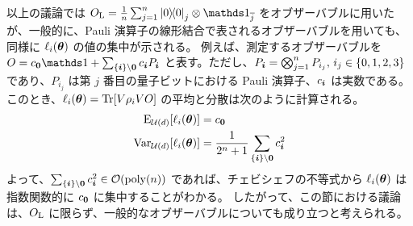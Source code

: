 以上の議論では $O_{\rmL} = \frac{1}{n} \sum_{j=1}^{n}\dyad{0}_{j} \otimes \bbid_{\bar{j}}$ をオブザーバブルに用いたが、一般的に、Pauli 演算子の線形結合で表されるオブザーバブルを用いても、同様に $\ell_i(\boldsymbol{\theta})$ の値の集中が示される。
例えば、測定するオブザーバブルを $O = c_{\bs{0}}\bbid + \sum_{\{\bs{i}\}\backslash\bs{0}} c_{\bs{i}}P_{\bs{i}}$ と表す。ただし、$P_{\boldsymbol{i}} = \bigotimes_{j=1}^n P_{i_j},\, i_j \in \{0,1,2,3\}$ であり、$P_{i_j}$ は第 $j$ 番目の量子ビットにおける Pauli 演算子、$c_{\boldsymbol{i}}$ は実数である。
このとき、$\ell_i(\boldsymbol{\theta}) = \Tr[V\rho_iV O]$ の平均と分散は次のように計算される。
\begin{align}
    \operatorname{E}_{\mathcal{U}(d)}[\ell_i(\boldsymbol{\theta})]   &= c_{\boldsymbol{0}}\\
    \operatorname{Var}_{\mathcal{U}(d)}[\ell_i(\boldsymbol{\theta})] &= \frac{1}{2^n+1}\sum_{\{\boldsymbol{i}\}\backslash\boldsymbol{0}} c_{\boldsymbol{i}}^2
\end{align}
よって、$\sum_{\{\bs{i}\}\backslash\bs{0}} c_{\bs{i}}^2 \in \order{\poly(n)}$ であれば、チェビシェフの不等式から $\ell_i(\boldsymbol{\theta})$ は指数関数的に $c_{\boldsymbol{0}}$ に集中することがわかる。
したがって、この節における議論は、$O_{\mathrm{L}}$ に限らず、一般的なオブザーバブルについても成り立つと考えられる。


